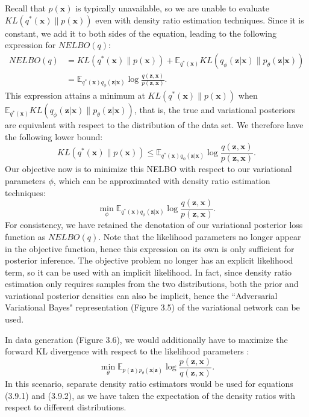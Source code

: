 \documentclass[honours,12pt]{unswthesis}
\numberwithin{equation}{section}
\theoremstyle{definition}
\begin{document}
Recall that $p(\bm{x})$ is typically unavailable, so we are unable to evaluate $KL(q^*(\bm{x})\|p(\bm{x}))$ even with density ratio estimation techniques. Since it is constant, we add it to both sides of the equation, leading to the following expression for $NELBO(q)$:
\begin{align*}
NELBO(q) &= KL(q^*(\bm{x})\|p(\bm{x}))+\mathbb{E}_{q^*(\bm{x})}KL(q_\phi(\bm{z}|\bm{x})\|p_\theta(\bm{z}|\bm{x}))\\
&=\mathbb{E}_{q^*(\bm{x})q_\phi(\bm{z}|\bm{x})}\log \frac{q(\bm{z},\bm{x})}{p(\bm{z},\bm{x})}.
\end{align*}
This expression attains a minimum at $KL(q^*(\bm{x})\|p(\bm{x}))$ when $\mathbb{E}_{q^*(\bm{x})}KL(q_\phi(\bm{z}|\bm{x})\|p_\theta(\bm{z}|\bm{x}))$, that is, the true and variational posteriors are equivalent with respect to the distribution of the data set. We therefore have the following lower bound:
\[KL(q^*(\bm{x})\|p(\bm{x}))\leq \mathbb{E}_{q^*(\bm{x})q_\phi(\bm{z}|\bm{x})}\log \frac{q(\bm{z},\bm{x})}{p(\bm{z},\bm{x})}.\]
Our objective now is to minimize this NELBO with respect to our variational parameters $\phi$, which can be approximated with density ratio estimation techniques:
\begin{equation}
\min_\phi \mathbb{E}_{q^*(\bm{x})q_\phi(\bm{z}|\bm{x})}\log \frac{q(\bm{z},\bm{x})}{p(\bm{z},\bm{x})}.
\end{equation}
For consistency, we have retained the denotation of our variational posterior loss function as $NELBO(q)$. Note that the likelihood parameters no longer appear in the objective function, hence this expression on its own is only sufficient for posterior inference. The objective problem no longer has an explicit likelihood term, so it can be used with an implicit likelihood. In fact, since density ratio estimation only requires samples from the two distributions, both the prior and variational posterior densities can also be implicit, hence the ``Adversarial Variational Bayes" representation (Figure 3.5) of the variational network can be used.

In data generation (Figure 3.6), we would additionally have to maximize the forward KL divergence with respect to the likelihood parameters \citep{tiao}:
\begin{equation}
\min_\theta \mathbb{E}_{p(\bm{z})p_\theta(\bm{x}|\bm{z})}\log \frac{p(\bm{z},\bm{x})}{q(\bm{z},\bm{x})}.
\end{equation}
In this scenario, separate density ratio estimators would be used for equations (3.9.1) and (3.9.2), as we have taken the expectation of the density ratios with respect to different distributions.
\end{document}
